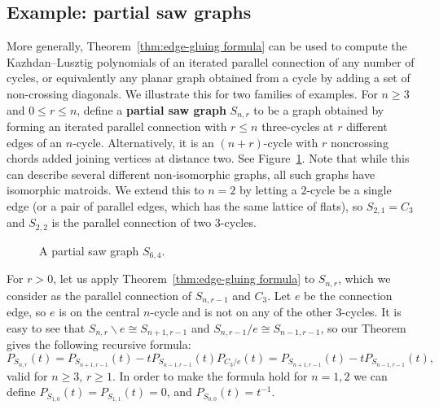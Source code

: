 \documentclass[12pt,reqno]{amsart}
\theoremstyle{definition}
\theoremstyle{remark}
\newcommand{\ssm}{\smallsetminus}
\renewcommand{\(}{\left(}
\renewcommand{\)}{\right)}
\newcommand{\<}{\left<}
\renewcommand{\>}{\right>}
\begin{document}
\subsection{Example: partial saw graphs}
More generally, Theorem~\ref{thm:edge-gluing formula} can be used to compute the Kazhdan--Lusztig polynomials of an iterated parallel connection of any number of cycles, or equivalently any planar graph obtained from a cycle by adding a set of non-crossing diagonals.  We illustrate this for two families of examples.  For $n \ge 3$ and $0 \le r \le n$, define a \textbf{partial saw graph}  $S_{n,r}$ to be a graph obtained by forming an iterated parallel connection with $r \le n$ three-cycles at $r$ different edges of an $n$-cycle.  Alternatively, it is an $(n+r)$-cycle with $r$ noncrossing chords added joining vertices at distance two. 
See Figure~\ref{saw}.
Note that while this can describe several different non-isomorphic graphs, all such graphs have isomorphic matroids.  We extend this to $n=2$ by letting a $2$-cycle be a single edge (or a pair of parallel edges, which has the same lattice of flats), so 
$S_{2,1} = C_3$ and $S_{2,2}$ is the parallel connection of two $3$-cycles.

\begin{figure}[!ht]
\centering
{}
\caption{A partial saw graph $S_{6,4}$.}\label{saw}
\end{figure}

For $r > 0$, let us apply Theorem~\ref{thm:edge-gluing formula} to $S_{n,r}$, which we consider as 
the parallel connection of $S_{n,r-1}$ and $C_3$.  Let $e$ be the connection edge, so $e$ is on the central $n$-cycle and is not on any of the other $3$-cycles.
It is easy to see that $S_{n,r} \ssm e \cong S_{n+1,r-1}$ and $S_{n,r-1}/e \cong S_{n-1,r-1}$,  so our Theorem gives the following recursive formula:
\[P_{S_{n,r}}(t) =  P_{S_{n+1,r-1}}(t) - tP_{S_{n-1,r-1}}(t)P_{C_3/e}(t) = 
P_{S_{n+1,r-1}}(t) - tP_{S_{n-1,r-1}}(t),\]
valid for $n\ge 3$, $r\ge 1$.  In order to make the formula hold for $n=1,2$ we can define
$P_{S_{1,0}}(t) = P_{S_{1,1}}(t) = 0$, and $P_{S_{0,0}}(t) = t^{-1}$.
\end{document}
